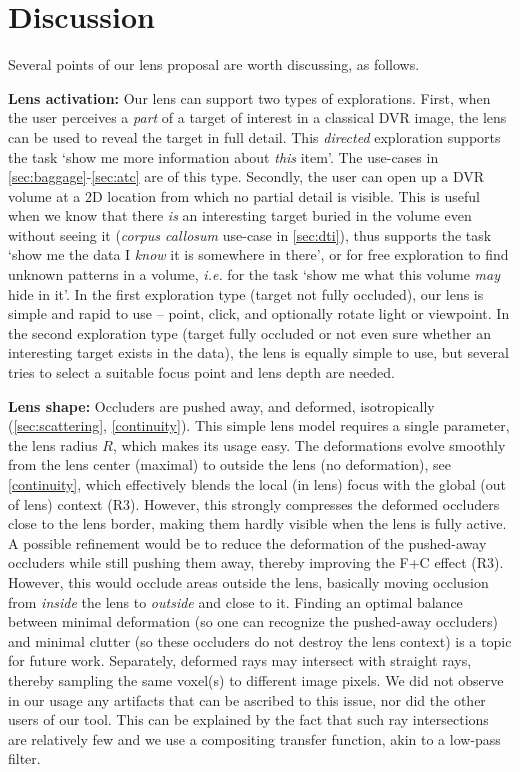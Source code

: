 %
\section{Discussion}
\label{sec:discussion}
%
%
Several points of our lens proposal are worth discussing, as follows.


\par \textbf{Lens activation:} Our lens can support two types of explorations. First, when the user perceives a \emph{part} of a target of interest in a classical DVR image, the lens can be used to reveal the target in full detail. This \emph{directed} exploration supports the task `show me more information about \emph{this} item'. The use-cases in \autoref{sec:baggage}-\autoref{sec:atc} are of this type. Secondly, the user can open up a DVR volume at a 2D location from which no partial detail is visible. This is useful when we know that there \emph{is} an interesting target buried in the volume even without seeing it (\emph{corpus callosum} use-case in \autoref{sec:dti}), thus supports the task `show me the data I \emph{know} it is somewhere in there', or for free exploration to find unknown patterns in a volume, \emph{i.e.} for the task `show me what this volume \emph{may} hide in it'. In the first exploration type (target not fully occluded), our lens is simple and rapid to use -- point, click, and optionally rotate light or viewpoint. In the second exploration type (target fully occluded or not even sure whether an interesting target exists in the data), the lens is equally simple to use, but several tries to select a suitable focus point and lens depth are needed.

\par \textbf{Lens shape:} Occluders are pushed away, and deformed, isotropically (\autoref{sec:scattering}, \autoref{continuity}). This simple lens model requires a single parameter, the lens radius $R$, which makes its usage easy. The deformations evolve smoothly from the lens center (maximal) to outside the lens (no deformation), see \autoref{continuity}, which effectively blends the local (in lens) focus with the global (out of lens) context (R3). However, this strongly compresses the deformed occluders close to the lens border, making them hardly visible when the lens is fully active. A possible refinement would be to reduce the deformation of the pushed-away occluders while still pushing them away, thereby improving the F+C effect (R3). However, this would occlude areas outside the lens, basically moving occlusion from \emph{inside} the lens to \emph{outside} and close to it. Finding an optimal balance between minimal deformation (so one can recognize the pushed-away occluders) and minimal clutter (so these occluders do not destroy the lens context) is a topic for future work. Separately, deformed rays may intersect with straight rays, thereby sampling the same voxel(s) to different image pixels. We did not observe in our usage any artifacts that can be ascribed to this issue, nor did the other users of our tool. This can be explained by the fact that such ray intersections are relatively few and we use a compositing transfer function, akin to a low-pass filter.


